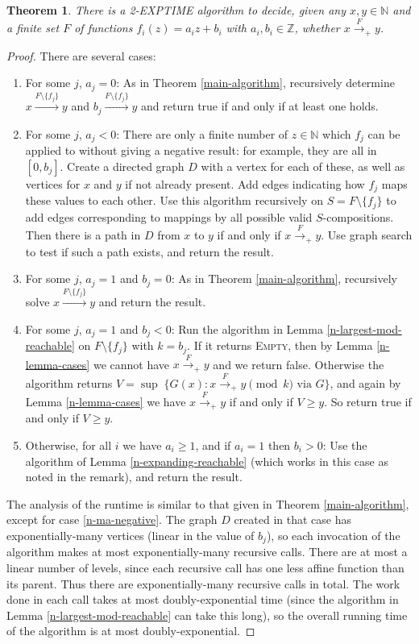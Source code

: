 \documentclass[11pt]{amsart}
\newcommand{\N}{\mathbb{N}}
\newcommand{\Z}{\mathbb{Z}}
\newtheorem{theorem}{Theorem}
\theoremstyle{definition}
\theoremstyle{remark}
\begin{document}
\begin{theorem}
There is a \textsf{2-EXPTIME} algorithm to decide, given any $x, y \in \N$ and a finite set $F$ of functions $f_i(z) = a_i z + b_i$ with $a_i, b_i \in \Z$, whether $x \xrightarrow{F}_+ y$.
\end{theorem}
\begin{proof}
There are several cases:
\begin{enumerate}
\item For some $j$, $a_j = 0$: As in Theorem \ref{main-algorithm}, recursively determine $x \xrightarrow{F \setminus \{f_j\}} y$ and $b_j \xrightarrow{F \setminus \{f_j\}} y$ and return true if and only if at least one holds.
\item For some $j$, $a_j < 0$: There are only a finite number of $z \in \N$ which $f_j$ can be applied to without giving a negative result: for example, they are all in $[0, b_j]$. Create a directed graph $D$ with a vertex for each of these, as well as vertices for $x$ and $y$ if not already present. Add edges indicating how $f_j$ maps these values to each other. Use this algorithm recursively on $S = F \setminus \{f_j\}$ to add edges corresponding to mappings by all possible valid $S$-compositions. Then there is a path in $D$ from $x$ to $y$ if and only if $x \xrightarrow{F}_+ y$. Use graph search to test if such a path exists, and return the result. \label{n-ma-negative}
\item For some $j$, $a_j = 1$ and $b_j = 0$: As in Theorem \ref{main-algorithm}, recursively solve $x \xrightarrow{F \setminus \{f_j\}} y$ and return the result.
\item For some $j$, $a_j = 1$ and $b_j < 0$: Run the algorithm in Lemma \ref{n-largest-mod-reachable} on $F \setminus \{f_j\}$ with $k = b_j$. If it returns \textsc{Empty}, then by Lemma \ref{n-lemma-cases} we cannot have $x \xrightarrow{F}_+ y$ and we return false. Otherwise the algorithm returns $V = \sup \; \{ G(x) : x \xrightarrow{F}_+ y \pmod k \text{ via } G \}$, and again by Lemma \ref{n-lemma-cases} we have $x \xrightarrow{F}_+ y$ if and only if $V \ge y$. So return true if and only if $V \ge y$.
\item Otherwise, for all $i$ we have $a_i \ge 1$, and if $a_i = 1$ then $b_i > 0$: Use the algorithm of Lemma \ref{n-expanding-reachable} (which works in this case as noted in the remark), and return the result.
\end{enumerate}
The analysis of the runtime is similar to that given in Theorem \ref{main-algorithm}, except for case \ref{n-ma-negative}. The graph $D$ created in that case has exponentially-many vertices (linear in the value of $b_j$), so each invocation of the algorithm makes at most exponentially-many recursive calls. There are at most a linear number of levels, since each recursive call has one less affine function than its parent. Thus there are exponentially-many recursive calls in total. The work done in each call takes at most doubly-exponential time (since the algorithm in Lemma \ref{n-largest-mod-reachable} can take this long), so the overall running time of the algorithm is at most doubly-exponential.
\end{proof}
\end{document}
